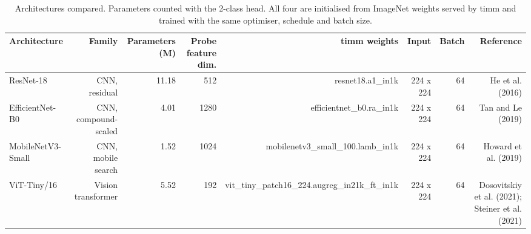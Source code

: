 \begin{table}[htbp]
\centering
\caption{Architectures compared. Parameters counted with the 2-class head. All four are initialised from ImageNet weights served by timm and trained with the same optimiser, schedule and batch size.}
\label{tab:arquitecturas}
\begin{tabular}{lrrrrrrr}
\toprule
Architecture & Family & Parameters (M) & Probe feature dim. & timm weights & Input & Batch & Reference \\
\midrule
ResNet-18 & CNN, residual & 11.18 & 512 & resnet18.a1\_in1k & 224 x 224 & 64 & He et al. (2016) \\
EfficientNet-B0 & CNN, compound-scaled & 4.01 & 1280 & efficientnet\_b0.ra\_in1k & 224 x 224 & 64 & Tan and Le (2019) \\
MobileNetV3-Small & CNN, mobile search & 1.52 & 1024 & mobilenetv3\_small\_100.lamb\_in1k & 224 x 224 & 64 & Howard et al. (2019) \\
ViT-Tiny/16 & Vision transformer & 5.52 & 192 & vit\_tiny\_patch16\_224.augreg\_in21k\_ft\_in1k & 224 x 224 & 64 & Dosovitskiy et al. (2021); Steiner et al. (2021) \\
\bottomrule
\end{tabular}
\end{table}
